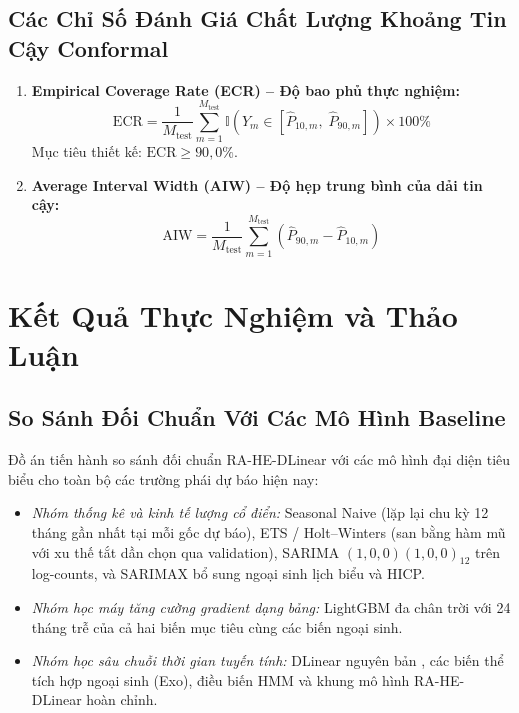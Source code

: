 \subsection{Các Chỉ Số Đánh Giá Chất Lượng Khoảng Tin Cậy Conformal}
\begin{enumerate}
    \item \textbf{Empirical Coverage Rate (ECR) -- Độ bao phủ thực nghiệm:}
    \begin{equation}
        \text{ECR} = \frac{1}{M_{\text{test}}} \sum_{m=1}^{M_{\text{test}}} \mathbb{I}\left( Y_m \in [\hat{P}_{10, m}, \; \hat{P}_{90, m}] \right) \times 100\%
    \end{equation}
    Mục tiêu thiết kế: $\text{ECR} \ge 90{,}0\%$.
    \item \textbf{Average Interval Width (AIW) -- Độ hẹp trung bình của dải tin cậy:}
    \begin{equation}
        \text{AIW} = \frac{1}{M_{\text{test}}} \sum_{m=1}^{M_{\text{test}}} (\hat{P}_{90, m} - \hat{P}_{10, m})
    \end{equation}
\end{enumerate}

\section{Kết Quả Thực Nghiệm và Thảo Luận}
\label{sec:experimental_results_discussion}

\subsection{So Sánh Đối Chuẩn Với Các Mô Hình Baseline}
Đồ án tiến hành so sánh đối chuẩn RA-HE-DLinear với các mô hình đại diện tiêu biểu cho toàn bộ các trường phái dự báo hiện nay:
\begin{itemize}
    \item \textit{Nhóm thống kê và kinh tế lượng cổ điển:} Seasonal Naive (lặp lại chu kỳ 12 tháng gần nhất tại mỗi gốc dự báo), ETS / Holt--Winters (san bằng hàm mũ với xu thế tắt dần chọn qua validation), SARIMA $(1,0,0)(1,0,0)_{12}$ trên log-counts, và SARIMAX bổ sung ngoại sinh lịch biểu và HICP.
    \item \textit{Nhóm học máy tăng cường gradient dạng bảng:} LightGBM đa chân trời với 24 tháng trễ của cả hai biến mục tiêu cùng các biến ngoại sinh.
    \item \textit{Nhóm học sâu chuỗi thời gian tuyến tính:} DLinear nguyên bản \cite{zeng2023dlinear}, các biến thể tích hợp ngoại sinh (Exo), điều biến HMM và khung mô hình RA-HE-DLinear hoàn chỉnh.
\end{itemize}

